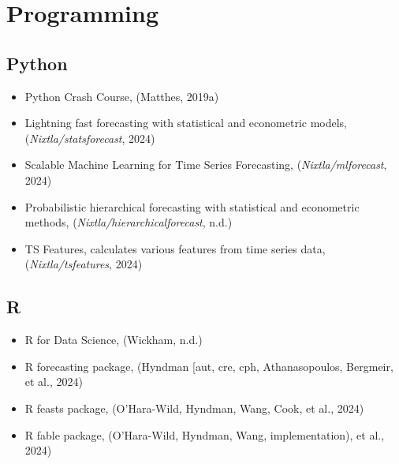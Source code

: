 \documentclass[
  american,
  10,
  a4paper,
]{book}
\providecommand{\tightlist}{%
  \setlength{\itemsep}{0pt}\setlength{\parskip}{0pt}}
\theoremstyle{definition}
\theoremstyle{remark}
\begin{document}
\section{Programming}\label{programming}

\subsection{Python}\label{python}

\begin{itemize}
\tightlist
\item
  Python Crash Course, (Matthes, 2019a)
\item
  Lightning fast forecasting with statistical and econometric models,
  (\emph{Nixtla/statsforecast}, 2024)
\item
  Scalable Machine Learning for Time Series Forecasting,
  (\emph{Nixtla/mlforecast}, 2024)
\item
  Probabilistic hierarchical forecasting with statistical and
  econometric methods, (\emph{Nixtla/hierarchicalforecast}, n.d.)
\item
  TS Features, calculates various features from time series data,
  (\emph{Nixtla/tsfeatures}, 2024)
\end{itemize}

\subsection{R}\label{r}

\begin{itemize}
\tightlist
\item
  R for Data Science, (Wickham, n.d.)
\item
  R forecasting package, (Hyndman {[}aut, cre, cph, Athanasopoulos,
  Bergmeir, et al., 2024)
\item
  R feasts package, (O'Hara-Wild, Hyndman, Wang, Cook, et al., 2024)
\item
  R fable package, (O'Hara-Wild, Hyndman, Wang, implementation), et al.,
  2024)
\end{itemize}
\end{document}
